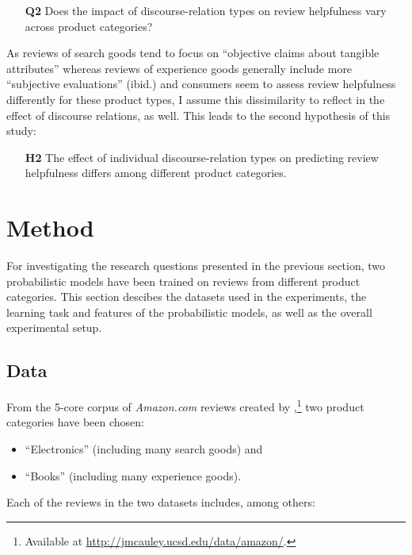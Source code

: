 \documentclass[
    a4paper,%
    12pt,%
    oneside,%
    toc=bibliography,
    final,
]{scrartcl}
\begin{document}
\begin{enumerate}[rightmargin=1cm]
\item[\textbf{Q2}] Does the impact of discourse-relation types on review helpfulness vary across product categories?
\end{enumerate}

As reviews of search goods tend to focus on “objective claims about tangible attributes” \citep[189]{MudambiSchuff2010} whereas reviews of experience goods generally include more “subjective evaluations” (ibid.) and consumers seem to assess review helpfulness differently for these product types, I assume this dissimilarity to reflect in the effect of discourse relations, as well. This leads to the second hypothesis of this study:

\begin{enumerate}[rightmargin=1cm]
\item[\textbf{H2}] The effect of individual discourse-relation types on predicting review helpfulness differs among different product categories.
\end{enumerate}

\section{Method}
\label{sec:method}

For investigating the research questions presented in the previous section, two probabilistic models have been trained on reviews from different product categories. This section descibes the datasets used in the experiments, the learning task and features of the probabilistic models, as well as the overall experimental setup.

\subsection{Data}

From the 5-core corpus of \textit{Amazon.com} reviews created by \citet{HeMcAuley2016},\footnote{Available at \url{http://jmcauley.ucsd.edu/data/amazon/}.} two product categories have been chosen:

\begin{itemize}
\item “Electronics” (including many search goods) and
\item “Books” (including many experience goods).
\end{itemize}

Each of the reviews in the two datasets includes, among others:
\end{document}
